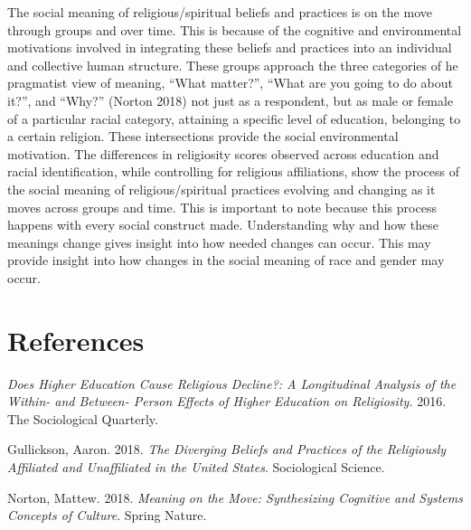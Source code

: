 \documentclass[
  12pt,
  letterpaper,
]{article}
\newlength{\cslhangindent}
\newlength{\cslentryspacingunit} %
\newenvironment{CSLReferences}[2] %
 {%
  \setlength{\parindent}{0pt}
  \ifodd #1
  \let\oldpar\par
  \def\par{\hangindent=\cslhangindent\oldpar}
  \fi
  \setlength{\parskip}{#2\cslentryspacingunit}
 }%
 {}
\begin{document}
The social meaning of religious/spiritual beliefs and practices is on
the move through groups and over time. This is because of the cognitive
and environmental motivations involved in integrating these beliefs and
practices into an individual and collective human structure. These
groups approach the three categories of he pragmatist view of meaning,
``What matter?'', ``What are you going to do about it?'', and ``Why?''
(Norton 2018) not just as a respondent, but as male or female of a
particular racial category, attaining a specific level of education,
belonging to a certain religion. These intersections provide the social
environmental motivation. The differences in religiosity scores observed
across education and racial identification, while controlling for
religious affiliations, show the process of the social meaning of
religious/spiritual practices evolving and changing as it moves across
groups and time. This is important to note because this process happens
with every social construct made. Understanding why and how these
meanings change gives insight into how needed changes can occur. This
may provide insight into how changes in the social meaning of race and
gender may occur.

\hypertarget{bibliography}{%
\section*{References}\label{bibliography}}

\hypertarget{refs}{}
\begin{CSLReferences}{1}{0}
\leavevmode{}%
\emph{Does Higher Education Cause Religious Decline?: A Longitudinal
Analysis of the Within- and Between- Person Effects of Higher Education
on Religiosity.} 2016. The Sociological Quarterly.

\leavevmode{}%
Gullickson, Aaron. 2018. \emph{The Diverging Beliefs and Practices of
the Religiously Affiliated and Unaffiliated in the United States}.
Sociological Science.

\leavevmode{}%
Norton, Mattew. 2018. \emph{Meaning on the Move: Synthesizing Cognitive
and Systems Concepts of Culture}. Spring Nature.

\end{CSLReferences}
\end{document}
